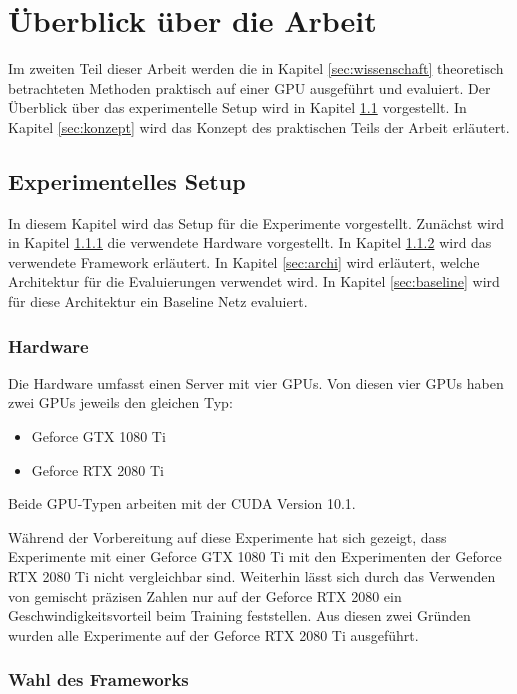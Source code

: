 \chapter{Überblick über die Arbeit}\label{sec:experimente}
Im zweiten Teil dieser Arbeit werden die in Kapitel \ref{sec:wissenschaft} theoretisch betrachteten Methoden praktisch auf einer GPU ausgeführt und evaluiert. Der Überblick über das experimentelle Setup wird in Kapitel \ref{sec:setup} vorgestellt. In Kapitel \ref{sec:konzept} wird das Konzept des praktischen Teils der Arbeit erläutert.

\section{Experimentelles Setup}\label{sec:setup}
In diesem Kapitel wird das Setup für die Experimente vorgestellt. Zunächst wird in Kapitel \ref{sec:hard} die verwendete Hardware vorgestellt. In Kapitel \ref{sec:framework} wird das verwendete Framework erläutert. In Kapitel \ref{sec:archi} wird erläutert, welche Architektur für die Evaluierungen verwendet wird. In Kapitel \ref{sec:baseline} wird für diese Architektur ein Baseline Netz evaluiert.
\subsection{Hardware}\label{sec:hard}
Die Hardware umfasst einen Server mit vier GPUs.
Von diesen vier GPUs haben zwei GPUs jeweils den gleichen Typ:
\begin{itemize}
 \item Geforce GTX 1080 Ti
 \item Geforce RTX 2080 Ti 
\end{itemize}

Beide GPU-Typen arbeiten mit der CUDA Version 10.1. 

Während der Vorbereitung auf diese Experimente hat sich gezeigt, dass Experimente mit einer Geforce GTX 1080 Ti mit den Experimenten der Geforce RTX 2080 Ti nicht vergleichbar sind. Weiterhin lässt sich durch das Verwenden von gemischt präzisen Zahlen nur auf der Geforce RTX 2080 ein Geschwindigkeitsvorteil beim Training feststellen. Aus diesen zwei Gründen wurden alle Experimente auf der Geforce RTX 2080 Ti ausgeführt.  


\subsection{Wahl des Frameworks}\label{sec:framework}


